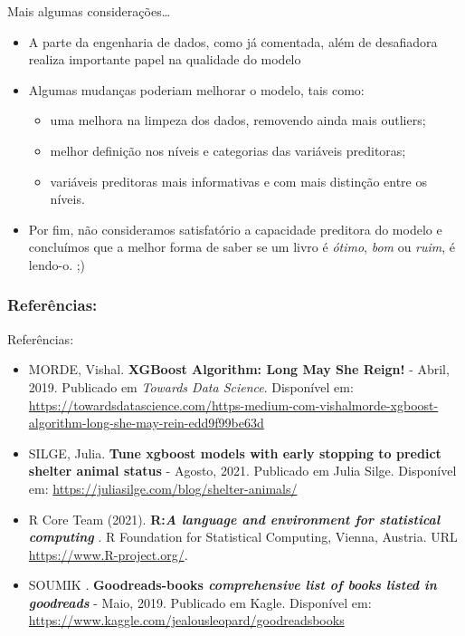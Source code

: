 \documentclass[
  9 pt,
  ignorenonframetext,
]{beamer}
\providecommand{\tightlist}{%
  \setlength{\itemsep}{0pt}\setlength{\parskip}{0pt}}
\begin{document}
\begin{frame}{Mais algumas considerações\ldots{}}
\begin{itemize}
\item
  A parte da engenharia de dados, como já comentada, além de desafiadora
  realiza importante papel na qualidade do modelo
\item
  Algumas mudanças poderiam melhorar o modelo, tais como:

  \begin{itemize}
  \tightlist
  \item
    uma melhora na limpeza dos dados, removendo ainda mais outliers;
  \item
    melhor definição nos níveis e categorias das variáveis preditoras;
  \item
    variáveis preditoras mais informativas e com mais distinção entre os
    níveis.
  \end{itemize}
\item
  Por fim, não consideramos satisfatório a capacidade preditora do
  modelo e concluímos que a melhor forma de saber se um livro é
  \emph{ótimo}, \emph{bom} ou \emph{ruim}, é lendo-o. ;)
\end{itemize}
\end{frame}

\hypertarget{referuxeancias}{%
\subsubsection{Referências:}\label{referuxeancias}}

\begin{frame}{Referências:}
\begin{itemize}
\item
  MORDE, Vishal. \textbf{XGBoost Algorithm: Long May She Reign!} -
  Abril, 2019. Publicado em \emph{Towards Data Science}. Disponível em:
  \url{https://towardsdatascience.com/https-medium-com-vishalmorde-xgboost-algorithm-long-she-may-rein-edd9f99be63d}
\item
  SILGE, Julia. \textbf{Tune xgboost models with early stopping to
  predict shelter animal status} - Agosto, 2021. Publicado em Julia
  Silge. Disponível em:
  \url{https://juliasilge.com/blog/shelter-animals/}
\item
  R Core Team (2021). \textbf{R:\emph{A language and environment for
  statistical computing}} . R Foundation for Statistical Computing,
  Vienna, Austria. URL \url{https://www.R-project.org/}.
\item
  SOUMIK . \textbf{Goodreads-books \emph{comprehensive list of books
  listed in goodreads}} - Maio, 2019. Publicado em Kagle. Disponível em:
  \url{https://www.kaggle.com/jealousleopard/goodreadsbooks}
\end{itemize}
\end{frame}
\end{document}
